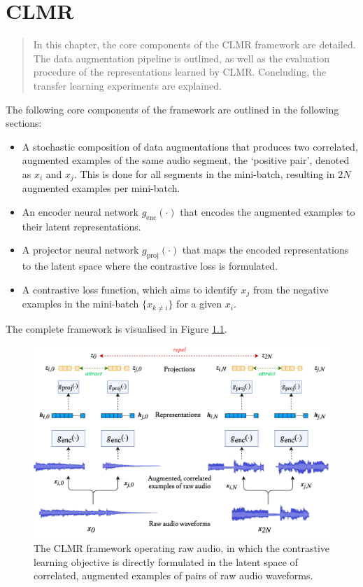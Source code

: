 
\chapter{CLMR}\label{sec:method}
\begin{quote}
    In this chapter, the core components of the CLMR framework are detailed. The data augmentation pipeline is outlined, as well as the evaluation procedure of the representations learned by CLMR. Concluding, the transfer learning experiments are explained.
\end{quote}

The following core components of the framework are outlined in the following sections:
\begin{itemize}
    \item A stochastic composition of data augmentations that produces two correlated, augmented examples of the same audio segment, the `positive pair', denoted as $x_i$ and $x_j$.
    This is done for all segments in the mini-batch, resulting in $2N$ augmented examples per mini-batch.
    \item An encoder neural network $g_{\mathrm{enc}}(\cdot)$ that encodes the augmented examples to their latent representations.
    \item A projector neural network $g_{\mathrm{proj}}(\cdot)$ that maps the encoded representations to the latent space where the contrastive loss is formulated.
    \item A contrastive loss function, which aims to identify $x_j$ from the negative examples in the mini-batch $\{x_{k\neq i}\}$ for a given $x_i$.
\end{itemize}

The complete framework is visualised in Figure \ref{fig:clmr_model}.

\begin{fullwidth}
    \begin{figure}[h]
        \includegraphics[width=\columnwidth]{figs/clmr_model.png}
        \caption{The CLMR framework operating raw audio, in which the contrastive learning objective is directly formulated in the latent space of correlated, augmented examples of pairs of raw audio waveforms.}
        \label{fig:clmr_model}
    \end{figure}
\end{fullwidth}


